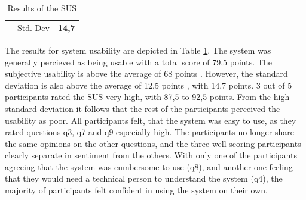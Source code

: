 \begin{table}[]
\begin{tabular}{llllllllllll}
    \rowcolor[HTML]{FFFFFF} 
                         & \multicolumn{10}{r}{\cellcolor[HTML]{FFFFFF}Std. Dev}                                                                                      & \textbf{14,7}      \\
    \end{tabular}
    \caption{Results of the SUS}
    \label{tab::sus}
    \end{table}


The results for system usability are depicted in Table \ref{tab::sus}.
The system was generally percieved as being usable with a total
score of 79,5 points. The subjective usability is above the
average of 68 points \cite{sauro2016quantifying}.
However, the standard deviation is also above the average of 
12,5 points \cite{sauro2016quantifying}, with 14,7 points.
3 out of 5 participants rated the SUS very high,
with 87,5 to 92,5 points. 
From the high standard deviation it follows that the rest of the 
participants perceived the usability as poor. 
All participants felt, that the system was easy to use,
as they rated questions q3, q7 and q9 especially high.
The participants no longer share the same opinions on the other questions, 
and the three well-scoring participants clearly separate 
in sentiment from the others.
With only one of the participants agreeing that the system
was cumbersome to use (q8), and another one feeling that they
would need a technical person to understand the system (q4),
the majority of participants felt confident in using the system on their own.

